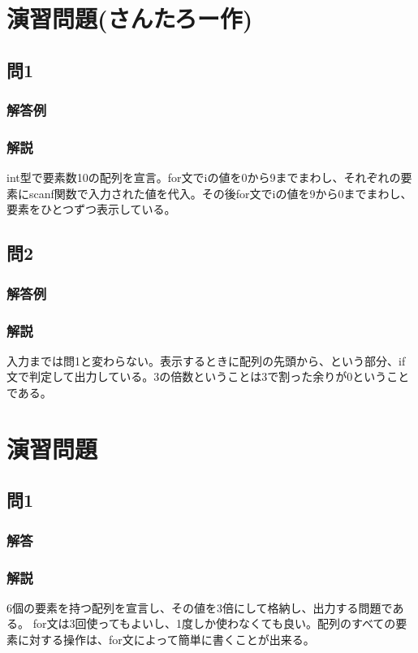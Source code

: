 \section{演習問題(さんたろー作)}
\subsection{問1}
\subsubsection{解答例}

\subsubsection{解説}
int型で要素数10の配列を宣言。for文でiの値を0から9までまわし、それぞれの要素にscanf関数で入力された値を代入。その後for文でiの値を9から0までまわし、要素をひとつずつ表示している。

\subsection{問2}
\subsubsection{解答例}

\subsubsection{解説}
入力までは問1と変わらない。表示するときに配列の先頭から、という部分、if文で判定して出力している。3の倍数ということは3で割った余りが0ということである。

\section{演習問題}
\subsection{問1}
\subsubsection{解答}

\subsubsection{解説}
6個の要素を持つ配列を宣言し、その値を3倍にして格納し、出力する問題である。
for文は3回使ってもよいし、1度しか使わなくても良い。配列のすべての要素に対する操作は、for文によって簡単に書くことが出来る。

